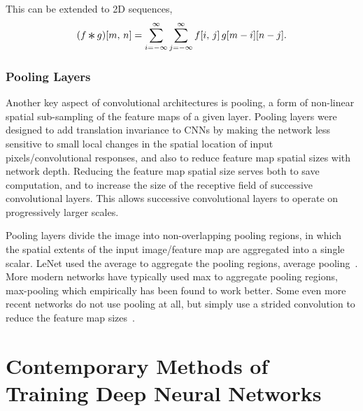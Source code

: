 \documentclass[thesis]{subfiles}
\begin{document}
This can be extended to 2D sequences,
\begin{equation}
(f \convolution g)[m,\,n] = \sum_{i=-\infty}^\infty \sum_{j=-\infty}^\infty f[i,\,j]\, g[m - i][n - j].
\end{equation}

\subsubsection{Pooling Layers}
Another key aspect of convolutional architectures is pooling, a form of non-linear spatial sub-sampling of the feature maps of a given layer. Pooling layers were designed to add translation invariance to CNNs by making the network less sensitive to small local changes in the spatial location of input pixels/convolutional responses, and also to reduce feature map spatial sizes with network depth. Reducing the feature map spatial size serves both to save computation, and to increase the size of the receptive field of successive convolutional layers. This allows successive convolutional layers to operate on progressively larger scales.

Pooling layers divide the image into non-overlapping pooling regions, in which the spatial extents of the input image/feature map are aggregated into a single scalar. LeNet used the average to aggregate the pooling regions, \ie average pooling~\citep{Lecun1998}. More modern networks have typically used max to aggregate pooling regions, \ie max-pooling which empirically has been found to work better. Some even more recent networks do not use pooling at all, but simply use a strided convolution to reduce the feature map sizes~\citep{He2015}.

\section{Contemporary Methods of Training Deep Neural Networks}
\label{section:contemporary}
\end{document}
